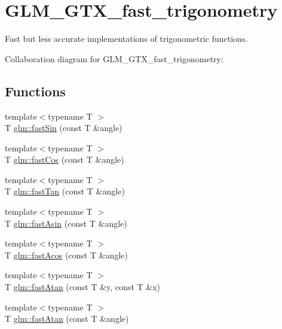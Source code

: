 \hypertarget{group__gtx__fast__trigonometry}{}\section{G\+L\+M\+\_\+\+G\+T\+X\+\_\+fast\+\_\+trigonometry}
\label{group__gtx__fast__trigonometry}


Fast but less accurate implementations of trigonometric functions.  


Collaboration diagram for G\+L\+M\+\_\+\+G\+T\+X\+\_\+fast\+\_\+trigonometry\+:
\subsection*{Functions}
\begin{DoxyCompactItemize}
\item 
{\footnotesize template$<$typename T $>$ }\\T \hyperlink{group__gtx__fast__trigonometry_ga8069d4fb062dc17d93183946cdb3bf3a}{glm\+::fast\+Sin} (const T \&angle)
\item 
{\footnotesize template$<$typename T $>$ }\\T \hyperlink{group__gtx__fast__trigonometry_gada306b7a16a4e230c28ea0764b325ef0}{glm\+::fast\+Cos} (const T \&angle)
\item 
{\footnotesize template$<$typename T $>$ }\\T \hyperlink{group__gtx__fast__trigonometry_gaf9f4798ceb6e0fc0b67bfcab836f0288}{glm\+::fast\+Tan} (const T \&angle)
\item 
{\footnotesize template$<$typename T $>$ }\\T \hyperlink{group__gtx__fast__trigonometry_gabe1e89bd95ee266f0f6b02e11f0f122c}{glm\+::fast\+Asin} (const T \&angle)
\item 
{\footnotesize template$<$typename T $>$ }\\T \hyperlink{group__gtx__fast__trigonometry_ga33b609e0abf9c38548d4381d0540b95b}{glm\+::fast\+Acos} (const T \&angle)
\item 
{\footnotesize template$<$typename T $>$ }\\T \hyperlink{group__gtx__fast__trigonometry_gaa788571fc615b131e96c66df01b10e36}{glm\+::fast\+Atan} (const T \&y, const T \&x)
\item 
{\footnotesize template$<$typename T $>$ }\\T \hyperlink{group__gtx__fast__trigonometry_gab6f0c71fbd1c4cd4c3e4992f3656178f}{glm\+::fast\+Atan} (const T \&angle)
\end{DoxyCompactItemize}


